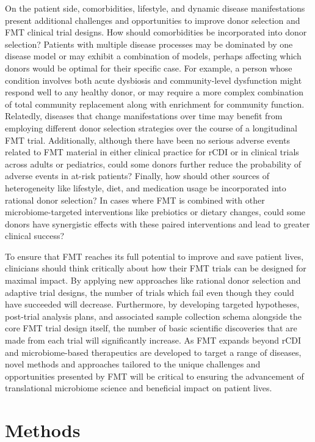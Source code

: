 On the patient side, comorbidities, lifestyle, and dynamic disease manifestations present additional challenges and opportunities to improve donor selection and FMT clinical trial designs.
How should comorbidities be incorporated into donor selection?
Patients with multiple disease processes may be dominated by one disease model or may exhibit a combination of models, perhaps affecting which donors would be optimal for their specific case.
For example, a person whose condition involves both acute dysbiosis and community-level dysfunction might respond well to any healthy donor, or may require a more complex combination of total community replacement along with enrichment for community function.
Relatedly, diseases that change manifestations over time may benefit from employing different donor selection strategies over the course of a longitudinal FMT trial.
Additionally, although there have been no serious adverse events related to FMT material in either clinical practice for rCDI or in clinical trials across adults or pediatrics, could some donors further reduce the probability of adverse events in at-risk patients?
Finally, how should other sources of heterogeneity like lifestyle, diet, and medication usage be incorporated into rational donor selection?
In cases where FMT is combined with other microbiome-targeted interventions like prebiotics or dietary changes, could some donors have synergistic effects with these paired interventions and lead to greater clinical success?

To ensure that FMT reaches its full potential to improve and save patient lives, clinicians should think critically about how their FMT trials can be designed for maximal impact.
By applying new approaches like rational donor selection and adaptive trial designs, the number of trials which fail even though they could have succeeded will decrease.
Furthermore, by developing targeted hypotheses, post-trial analysis plans, and associated sample collection schema alongside the core FMT trial design itself, the number of basic scientific discoveries that are made from each trial will significantly increase.
As FMT expands beyond rCDI and microbiome-based therapeutics are developed to target a range of diseases, novel methods and approaches tailored to the unique challenges and opportunities presented by FMT will be critical to ensuring the advancement of translational microbiome science and beneficial impact on patient lives.

\section{Methods}

